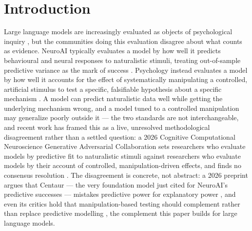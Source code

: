 \documentclass[pdflatex,sn-nature]{sn-jnl}
\begin{document}

\maketitle

\section{Introduction}\label{sec:intro}

Large language models are increasingly evaluated as objects of
psychological inquiry \citep{hagendorff2023machinepsych,
binz2023gpt3cogpsy}, but the communities doing this evaluation disagree
about what counts as evidence. NeuroAI typically evaluates a model by how
well it predicts behavioural and neural responses to naturalistic stimuli,
treating out-of-sample predictive variance as the mark of success
\citep{binz2025foundation}. Psychology instead evaluates a model by how
well it accounts for the effect of systematically manipulating a
controlled, artificial stimulus to test a specific, falsifiable hypothesis
about a specific mechanism \citep{bowers2023deepproblems}. A model can
predict naturalistic data well while getting the underlying mechanism
wrong, and a model tuned to a controlled manipulation may generalize
poorly outside it — the two standards are not interchangeable, and recent
work has framed this as a live, unresolved methodological disagreement
rather than a settled question: a 2026 Cognitive Computational Neuroscience
Generative Adversarial Collaboration sets researchers who evaluate models
by predictive fit to naturalistic stimuli against researchers who evaluate
models by their account of controlled, manipulation-driven effects, and
finds no consensus resolution \citep{gac2026neuroai}. The disagreement is
concrete, not abstract: a 2026 preprint argues that Centaur
\citep{binz2025foundation} — the very foundation model just cited for
NeuroAI's predictive successes — mistakes predictive power for explanatory
power \citep{bowers2026centaurcritique}, and even its critics hold that
manipulation-based testing should complement rather than replace predictive
modelling \citep{gac2026discussion}, the complement this paper builds for
large language models.
\end{document}
